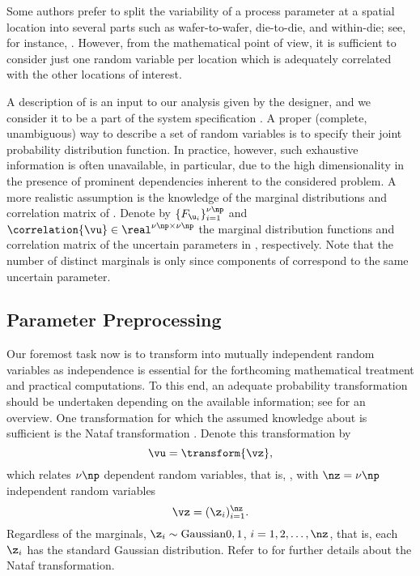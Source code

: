 \begin{remark}
Some authors prefer to split the variability of a process parameter at a spatial
location into several parts such as wafer-to-wafer, die-to-die, and within-die;
see, for instance, \cite{juan2012}. However, from the mathematical point of
view, it is sufficient to consider just one random variable per location which
is adequately correlated with the other locations of interest.
\end{remark}

A description of \vu is an input to our analysis given by the designer, and we
consider it to be a part of the system specification \spec. A proper (complete,
unambiguous) way to describe a set of random variables is to specify their joint
probability distribution function. In practice, however, such exhaustive
information is often unavailable, in particular, due to the high dimensionality
in the presence of prominent dependencies inherent to the considered problem. A
more realistic assumption is the knowledge of the marginal distributions and
correlation matrix of \vu. Denote by $\{ F_{\u_i} \}_{i = 1}^{\nu \np}$ and
$\correlation{\vu} \in \real^{\nu \np \times \nu \np}$ the marginal distribution
functions and correlation matrix of the uncertain parameters \vu in
, respectively. Note that the number of distinct
marginals is only \nu since \np components of \vu correspond to the same
uncertain parameter.

\subsection{Parameter Preprocessing}

Our foremost task now is to transform \vu into mutually independent random
variables as independence is essential for the forthcoming mathematical
treatment and practical computations. To this end, an adequate probability
transformation should be undertaken depending on the available information; see
\cite{eldred2008} for an overview. One transformation for which the assumed
knowledge about \vu is sufficient is the Nataf transformation \cite{li2008}.
Denote this transformation by
\[
  \vu = \transform{\vz},
\]
which relates $\nu \np$ dependent random variables, that is, \vu, with $\nz =
\nu \np$ independent random variables
\[
  \vz = (\z_i)_{i = 1}^\nz.
\]
Regardless of the marginals, $\z_i \sim \mathrm{Gaussian}{0, 1}$, $i = 1, 2,
\dots, \nz$, that is, each $\z_i$ has the standard Gaussian distribution. Refer
to  for further details about the Nataf
transformation.

